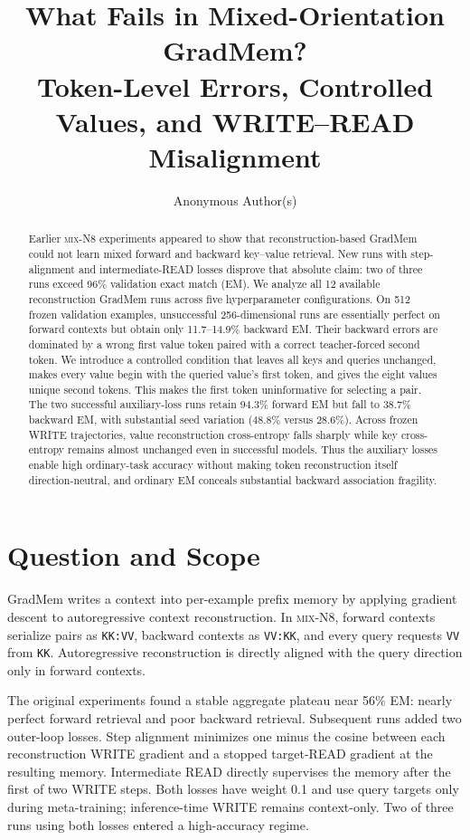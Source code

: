 \documentclass{article}
\title{What Fails in Mixed-Orientation GradMem?\\
Token-Level Errors, Controlled Values, and WRITE--READ Misalignment}
\author{Anonymous Author(s)}
\newcommand{\dataset}{\textsc{mix-N8}}
\newcommand{\gm}{GradMem}
\begin{document}
\maketitle

\begin{abstract}
Earlier \dataset{} experiments appeared to show that reconstruction-based \gm{} could not learn mixed forward and backward key--value retrieval.  New runs with step-alignment and intermediate-READ losses disprove that absolute claim: two of three runs exceed 96\% validation exact match (EM).  We analyze all 12 available reconstruction \gm{} runs across five hyperparameter configurations.  On 512 frozen validation examples, unsuccessful 256-dimensional runs are essentially perfect on forward contexts but obtain only 11.7--14.9\% backward EM.  Their backward errors are dominated by a wrong first value token paired with a correct teacher-forced second token.  We introduce a controlled condition that leaves all keys and queries unchanged, makes every value begin with the queried value's first token, and gives the eight values unique second tokens.  This makes the first token uninformative for selecting a pair.  The two successful auxiliary-loss runs retain 94.3\% forward EM but fall to 38.7\% backward EM, with substantial seed variation (48.8\% versus 28.6\%).  Across frozen WRITE trajectories, value reconstruction cross-entropy falls sharply while key cross-entropy remains almost unchanged even in successful models.  Thus the auxiliary losses enable high ordinary-task accuracy without making token reconstruction itself direction-neutral, and ordinary EM conceals substantial backward association fragility.
\end{abstract}

\section{Question and Scope}

\gm{} writes a context into per-example prefix memory by applying gradient descent to autoregressive context reconstruction.  In \dataset{}, forward contexts serialize pairs as \texttt{KK:VV}, backward contexts as \texttt{VV:KK}, and every query requests \texttt{VV} from \texttt{KK}.  Autoregressive reconstruction is directly aligned with the query direction only in forward contexts.

The original experiments found a stable aggregate plateau near 56\% EM: nearly perfect forward retrieval and poor backward retrieval.  Subsequent runs added two outer-loop losses.  Step alignment minimizes one minus the cosine between each reconstruction WRITE gradient and a stopped target-READ gradient at the resulting memory.  Intermediate READ directly supervises the memory after the first of two WRITE steps.  Both losses have weight 0.1 and use query targets only during meta-training; inference-time WRITE remains context-only.  Two of three runs using both losses entered a high-accuracy regime.
\end{document}
